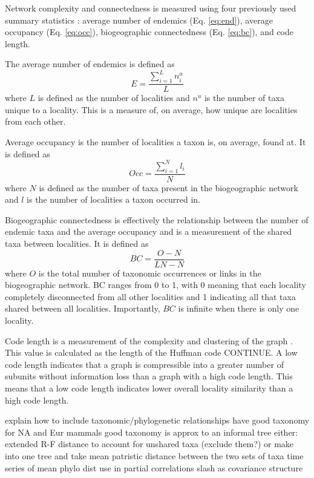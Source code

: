 \documentclass[12pt,letterpaper]{article}
\begin{document}
Network complexity and connectedness is measured using four previously used summary statistics \citep{Sidor2013}: average number of endemics (Eq. \ref{eq:end}), average occupancy (Eq. \ref{eq:occ}), biogeographic connectedness (Eq. \ref{eq:bc}), and code length. 

The average number of endemics is defined as 
\begin{equation}
  E = \frac{\sum_{i = 1}^{L} n_{i}^{u}}{L}
  \label{eq:end}
\end{equation}
where \(L\) is defined as the number of localities and \(n^{u}\) is the number of taxa unique to a locality. This is a measure of, on average, how unique are localities from each other.

Average occupancy is the number of localities a taxon is, on average, found at. It is defined as 
\begin{equation}
  Occ = \frac{\sum_{i = 1}^{N} l_{i}}{N}
  \label{eq:occ}
\end{equation}
where \(N\) is defined as the number of taxa present in the biogeographic network and \(l\) is the number of localities a taxon occurred in.

Biogeographic connectedness is effectively the relationship between the number of endemic taxa and the average occupancy and is a measurement of the shared taxa between localities. It is defined as 
\begin{equation}
  BC = \frac{O - N}{LN - N}
  \label{eq:bc}
\end{equation}
where \(O\) is the total number of taxonomic occurrences or links in the biogeographic network. BC ranges from 0 to 1, with 0 meaning that each locality completely disconnected from all other localities and 1 indicating all that taxa shared between all localities. Importantly, \(BC\) is infinite when there is only one locality.

Code length is a measurement of the complexity and clustering of the graph \citep{Rosvall2008,Rosvall2010b}. This value is calculated as the length of the Huffman code CONTINUE. A low code length indicates that a graph is compressible into a greater number of subunits without information loss than a graph with a high code length. This means that a low code length indicates lower overall locality similarity than a high code length. 

explain how to include taxonomic/phylogenetic relationships
have good taxonomy for NA and Eur mammals
good taxonomy is approx to an informal tree
either: extended R-F distance to account for unshared taxa (exclude them?) or make into one tree and take mean patristic distance between the two sets of taxa
time series of mean phylo dist
use in partial correlations slash as covariance structure
\end{document}
